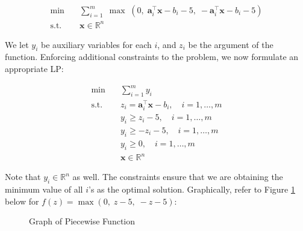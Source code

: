 \documentclass[12pt]{article}
\begin{document}
\begin{align*}
    \min \quad & \sum_{i=1}^{m} \; \max \; (0, \; \mathbf{a}_i^{\top} \mathbf{x} - b_i - 5, \; -\mathbf{a}_i^{\top} \mathbf{x} - b_i - 5) \\
    \text{s.t.} \quad & \mathbf{x} \in \mathbb{R}^n
\end{align*}

\noindent We let $y_i$ be auxiliary variables for each $i$, and $z_i$ be the argument of the function. Enforcing additional constraints to the problem, we now formulate an appropriate LP:

\begin{align*}
    \nonumber \min \quad & \sum_{i=1}^{m} y_i \\ 
    \text{s.t.} \quad & z_i = \mathbf{a}^{\top}_i \mathbf{x} - b_i, \quad i = 1, \dots , m \\ 
    & y_i \geq z_i - 5,  \quad i = 1, \dots , m \\ 
    & y_i \geq -z_i - 5, \quad i = 1, \dots , m \\ 
    & y_i \geq 0, \quad i = 1, \dots , m  \\
    & \mathbf{x} \in \mathbb{R}^{n} 
\end{align*}

\noindent Note that $y_i \in \mathbb{R}^n$ as well. The constraints ensure that we are obtaining the minimum value of all $i$'s as the optimal solution. Graphically, refer to Figure \ref{fig:5-piecewise} below for $f(z) = \max (0, \; z-5, \; -z-5)$: 

\begin{figure}[H]
    \centering
    \caption{Graph of Piecewise Function}
    \label{fig:5-piecewise}
\end{figure}
\end{document}

